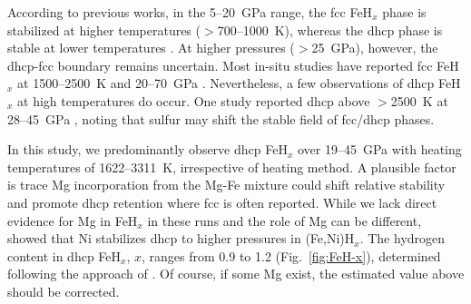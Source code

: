 \documentclass[draft,jgrga,12pt]{agujournal2019}
\begin{document}


According to previous works, in the 5--20~GPa range, the fcc FeH$_x$ phase is stabilized at higher temperatures ($>$700--1000~K), whereas the dhcp phase is stable at lower temperatures \cite{sakamaki_melting_2009,narygina_xray_2011}. 
At higher pressures ($>$25~GPa), however, the dhcp-fcc boundary remains uncertain.
Most in-situ studies have reported fcc FeH$_x$ at 1500--2500~K and 20--70~{GPa} \cite{piet_effect_2021,thompson_highpressure_2018,narygina_xray_2011}. 
Nevertheless, a few observations of dhcp FeH$_x$ at high temperatures do occur. 
One study reported dhcp above $>$2500~K at 28--45~{GPa} \cite{piet_effects_2021}, noting that sulfur may shift the stable field of fcc/dhcp phases. 

In this study, we predominantly observe dhcp FeH$_x$ over 19--45~{GPa} with heating temperatures of 1622--3311~K, irrespective of heating method. 
A plausible factor is trace Mg incorporation from the Mg-Fe mixture could shift relative stability and promote dhcp retention where fcc is often reported. 
While we lack direct evidence for Mg in FeH$_x$ in these runs and the role of Mg can be different,  showed that Ni stabilizes dhcp to higher pressures in (Fe,Ni)H$_x$.
The hydrogen content in dhcp FeH$_x$, $x$, ranges from 0.9 to 1.2 (Fig.~\ref{fig:FeH-x}), determined following the approach of .
Of course, if some Mg exist, the estimated value above should be corrected.
\end{document}
